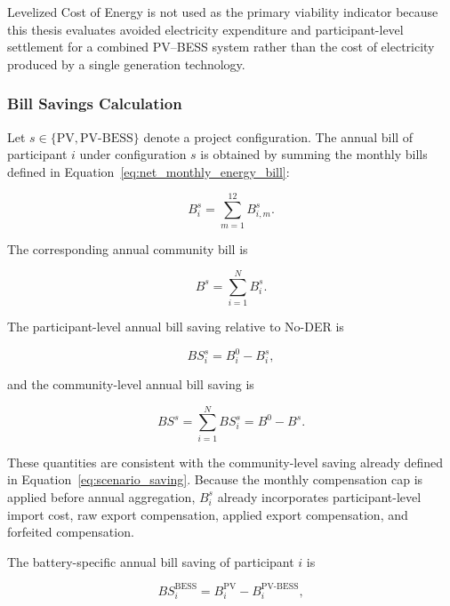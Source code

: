Levelized Cost of Energy is not used as the primary viability indicator because this thesis evaluates avoided electricity expenditure and participant-level settlement for a combined PV--BESS system rather than the cost of electricity produced by a single generation technology.

\subsubsection{Bill Savings Calculation}
\label{sec:ch5_bill_savings}

Let $s\in\{\mathrm{PV},\mathrm{PV\mbox{-}BESS}\}$ denote a project configuration. The annual bill of participant $i$ under configuration $s$ is obtained by summing the monthly bills defined in Equation~\eqref{eq:net_monthly_energy_bill}:

\begin{equation}
B_i^{s}=\sum_{m=1}^{12}B_{i,m}^{s}.
\label{eq:ch5_member_annual_bill}
\end{equation}

The corresponding annual community bill is

\begin{equation}
B^{s}=\sum_{i=1}^{N}B_i^{s}.
\label{eq:ch5_community_annual_bill}
\end{equation}

The participant-level annual bill saving relative to No-DER is

\begin{equation}
BS_i^{s}=B_i^{0}-B_i^{s},
\label{eq:ch5_member_bill_saving}
\end{equation}

and the community-level annual bill saving is

\begin{equation}
BS^{s}=\sum_{i=1}^{N}BS_i^{s}=B^{0}-B^{s}.
\label{eq:ch5_community_bill_saving}
\end{equation}

These quantities are consistent with the community-level saving already defined in Equation~\eqref{eq:scenario_saving}. Because the monthly compensation cap is applied before annual aggregation, $B_i^{s}$ already incorporates participant-level import cost, raw export compensation, applied export compensation, and forfeited compensation.

The battery-specific annual bill saving of participant $i$ is

\begin{equation}
BS_i^{\mathrm{BESS}}=B_i^{\mathrm{PV}}-B_i^{\mathrm{PV\mbox{-}BESS}},
\label{eq:ch5_member_bess_bill_saving}
\end{equation}

